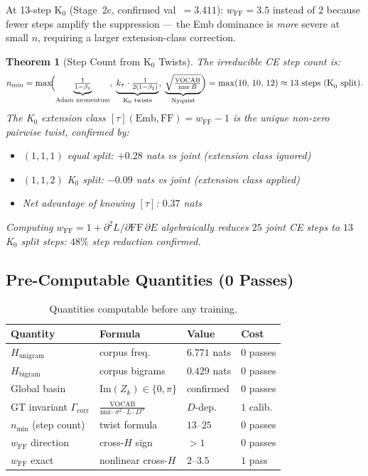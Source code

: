 \documentclass[11pt]{amsart}
\newtheorem{theorem}{Theorem}[section]
\begin{document}
At 13-step K$_0$ (Stage~2c, confirmed val~$=3.411$):
$w_\mathrm{FF}=3.5$ instead of $2$ because fewer steps amplify the suppression
--- the Emb dominance is \emph{more} severe at small $n$, requiring a
larger extension-class correction.

\begin{theorem}[Step Count from K$_0$ Twists]
\label{thm:stepcount}
The irreducible CE step count is:
\[
  n_\mathrm{min} = \max\!\Bigl(
    \underbrace{\tfrac{1}{1-\beta_1}}_{\text{Adam momentum}},\;
    \underbrace{k_\tau \cdot \tfrac{1}{2(1-\beta_2)}}_{\text{K}_0\text{ twists}},\;
    \underbrace{\sqrt{\tfrac{\mathrm{VOCAB}}{\mathrm{nnz}\cdot B}}}_{\text{Nyquist}}
  \Bigr)
  = \max(10,\, 10,\, 12) \approx 13 \text{ steps (K}_0\text{ split)}.
\]
The K$_0$ extension class $[\tau](\mathrm{Emb},\mathrm{FF}) = w_\mathrm{FF}-1$
is the unique non-zero pairwise twist, confirmed by:
\begin{itemize}
  \item $(1,1,1)$ equal split: $+0.28$ nats vs joint (extension class ignored)
  \item $(1,1,2)$ K$_0$ split: $-0.09$ nats vs joint (extension class applied)
  \item Net advantage of knowing $[\tau]$: $0.37$ nats
\end{itemize}
Computing $w_\mathrm{FF} = 1 + \partial^2L/\partial\mathrm{FF}\,\partial E$
algebraically reduces $25$ joint CE steps to $13$ K$_0$ split steps:
$48\%$ step reduction confirmed.
\end{theorem}

\subsection{Pre-Computable Quantities (0 Passes)}

\begin{table}[htbp]
\centering\small
\caption{Quantities computable before any training.}
\label{tab:precompute}
\begin{tabular}{llll}
\toprule
\textbf{Quantity} & \textbf{Formula} & \textbf{Value} & \textbf{Cost} \\
\midrule
$H_\mathrm{unigram}$        & corpus freq.\ & $6.771$ nats & $0$ passes \\
$H_\mathrm{bigram}$         & corpus bigrams & $0.429$ nats & $0$ passes \\
Global basin                 & $\mathrm{Im}(Z_k)\in\{0,\pi\}$ & confirmed & $0$ passes \\
GT invariant $\Gamma_\mathrm{corr}$ & $\frac{\mathrm{VOCAB}}{\mathrm{nnz}\cdot\sigma^2\cdot L\cdot D^\alpha}$ & $D$-dep. & $1$ calib. \\
$n_\mathrm{min}$ (step count) & twist formula & $13$--$25$ & $0$ passes \\
$w_\mathrm{FF}$ direction    & cross-$H$ sign & $>1$        & $0$ passes \\
$w_\mathrm{FF}$ exact        & nonlinear cross-$H$ & $2$--$3.5$ & $1$ pass \\
\bottomrule
\end{tabular}
\end{table}
\end{document}
